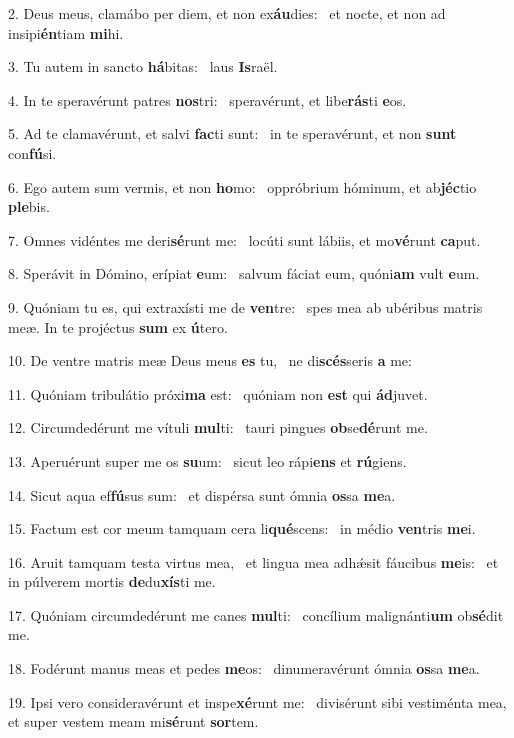 2. Deus meus, clamábo per diem, et non ex\textbf{áu}dies: \ast\  et nocte, et non ad insipi\textbf{én}tiam \textbf{mi}hi.\

3. Tu autem in sancto \textbf{há}bitas: \ast\  laus \textbf{Is}raël.\

4. In te speravérunt patres \textbf{nos}tri: \ast\  speravérunt, et libe\textbf{rás}ti \textbf{e}os.\

5. Ad te clamavérunt, et salvi \textbf{fac}ti sunt: \ast\  in te speravérunt, et non \textbf{sunt} con\textbf{fú}si.\

6. Ego autem sum vermis, et non \textbf{ho}mo: \ast\  oppróbrium hóminum, et ab\textbf{jéc}tio \textbf{ple}bis.\

7. Omnes vidéntes me deri\textbf{sé}runt me: \ast\  locúti sunt lábiis, et mo\textbf{vé}runt \textbf{ca}put.\

8. Sperávit in Dómino, erípiat \textbf{e}um: \ast\  salvum fáciat eum, quóni\textbf{am} vult \textbf{e}um.\

9. Quóniam tu es, qui extraxísti me de \textbf{ven}tre: \ast\  spes mea ab ubéribus matris meæ. In te projéctus \textbf{sum} ex \textbf{ú}tero.\

10. De ventre matris meæ Deus meus \textbf{es} tu, \ast\  ne di\textbf{scés}seris \textbf{a} me:\

11. Quóniam tribulátio próxi\textbf{ma} est: \ast\  quóniam non \textbf{est} qui \textbf{ád}juvet.\

12. Circumdedérunt me vítuli \textbf{mul}ti: \ast\  tauri pingues \textbf{ob}se\textbf{dé}runt me.\

13. Aperuérunt super me os \textbf{su}um: \ast\  sicut leo rápi\textbf{ens} et \textbf{rú}giens.\

14. Sicut aqua ef\textbf{fú}sus sum: \ast\  et dispérsa sunt ómnia \textbf{os}sa \textbf{me}a.\

15. Factum est cor meum tamquam cera li\textbf{qué}scens: \ast\  in médio \textbf{ven}tris \textbf{me}i.\

16. Aruit tamquam testa virtus mea, \dag\  et lingua mea adhǽsit fáucibus \textbf{me}is: \ast\  et in púlverem mortis \textbf{de}du\textbf{xís}ti me.\

17. Quóniam circumdedérunt me canes \textbf{mul}ti: \ast\  concílium malignánti\textbf{um} ob\textbf{sé}dit me.\

18. Fodérunt manus meas et pedes \textbf{me}os: \ast\  dinumeravérunt ómnia \textbf{os}sa \textbf{me}a.\

19. Ipsi vero consideravérunt et inspe\textbf{xé}runt me: \ast\  divisérunt sibi vestiménta mea, et super vestem meam mi\textbf{sé}runt \textbf{sor}tem.\

